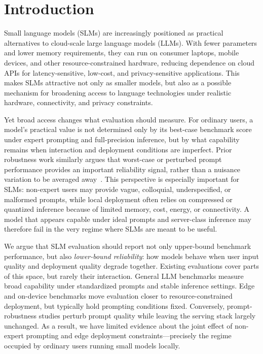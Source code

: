 \documentclass[letterpaper]{article} %
\begin{document}
\section{Introduction}
\label{sec:intro}

Small language models (SLMs) are increasingly positioned as practical alternatives to cloud-scale large language models (LLMs). With fewer parameters and lower memory requirements, they can run on consumer laptops, mobile devices, and other resource-constrained hardware, reducing dependence on cloud APIs for latency-sensitive, low-cost, and privacy-sensitive applications. This makes SLMs attractive not only as smaller models, but also as a possible mechanism for broadening access to language technologies under realistic hardware, connectivity, and privacy constraints.

Yet broad access changes what evaluation should measure. For ordinary users, a model's practical value is not determined only by its best-case benchmark score under expert prompting and full-precision inference, but by what capability remains when interaction and deployment conditions are imperfect. Prior robustness work similarly argues that worst-case or perturbed prompt performance provides an important reliability signal, rather than a nuisance variation to be averaged away~\cite{zhu2023promptrobust,ralpaca2024}. This perspective is especially important for SLMs: non-expert users may provide vague, colloquial, underspecified, or malformed prompts, while local deployment often relies on compressed or quantized inference because of limited memory, cost, energy, or connectivity. A model that appears capable under ideal prompts and server-class inference may therefore fail in the very regime where SLMs are meant to be useful.

We argue that SLM evaluation should report not only upper-bound benchmark performance, but also \emph{lower-bound reliability}: how models behave when user input quality and deployment quality degrade together. Existing evaluations cover parts of this space, but rarely their interaction. General LLM benchmarks measure broad capability under standardized prompts and stable inference settings. Edge and on-device benchmarks move evaluation closer to resource-constrained deployment, but typically hold prompting conditions fixed. Conversely, prompt-robustness studies perturb prompt quality while leaving the serving stack largely unchanged. As a result, we have limited evidence about the joint effect of non-expert prompting and edge deployment constraints---precisely the regime occupied by ordinary users running small models locally.
\end{document}
